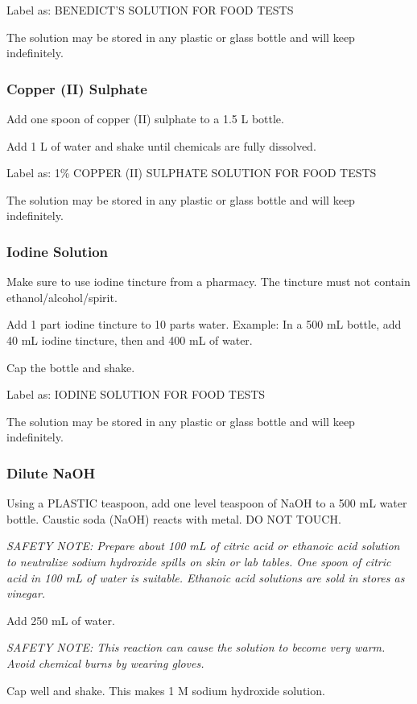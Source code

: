 \noindent Label as: BENEDICT'S SOLUTION FOR FOOD TESTS

\noindent The solution may be stored in any plastic or glass bottle and will keep indefinitely.

\subsubsection{Copper (II) Sulphate} 
\begin{itemize*}
\item Add one spoon of copper (II) sulphate to a 1.5 L bottle.
\item Add 1 L of water and shake until chemicals are fully dissolved.
\end{itemize*}

\noindent Label as: 1\% COPPER (II) SULPHATE SOLUTION FOR FOOD TESTS

\noindent The solution may be stored in any plastic or glass bottle and will keep indefinitely.

\subsubsection{Iodine Solution} 
Make sure to use iodine tincture from a pharmacy. The tincture must not contain ethanol\slash alcohol\slash spirit.

\begin{itemize*}
\item Add 1 part iodine tincture to 10 parts water. Example: In a 500 mL bottle, add 40 mL iodine tincture, then and 400 mL of water.
\item Cap the bottle and shake.
\end{itemize*}

\noindent Label as: IODINE SOLUTION FOR FOOD TESTS

\noindent The solution may be stored in any plastic or glass bottle and will keep indefinitely.

\subsubsection{Dilute NaOH} 
\begin{itemize*}
\item Using a PLASTIC teaspoon, add one level teaspoon of NaOH to a 500 mL water bottle. Caustic soda (NaOH) reacts with metal. DO NOT TOUCH.

\emph{SAFETY NOTE: Prepare about 100 mL of citric acid or ethanoic acid solution to neutralize sodium hydroxide spills on skin or lab tables. One spoon of citric acid in 100 mL of water is suitable. Ethanoic acid solutions are sold in stores as vinegar.}

\item Add 250 mL of water.

\emph{SAFETY NOTE: This reaction can cause the solution to become very warm. Avoid chemical burns by wearing gloves.}

\item Cap well and shake. This makes 1 M sodium hydroxide solution.
\end{itemize*}


